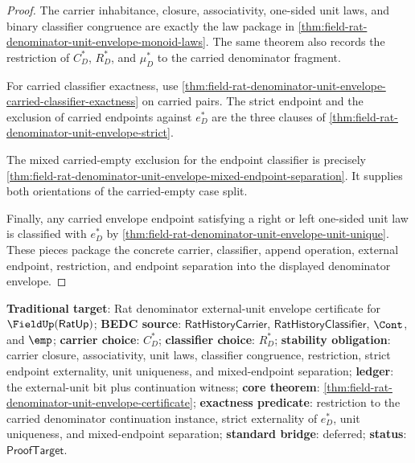 \begin{proof}
The carrier inhabitance, closure, associativity, one-sided unit laws, and binary
classifier congruence are exactly the law package in
\autoref{thm:field-rat-denominator-unit-envelope-monoid-laws}. The same theorem
also records the restriction of $C_D^\ast$, $R_D^\ast$, and $\mu_D^\ast$ to the
carried denominator fragment.

For carried classifier exactness, use
\autoref{thm:field-rat-denominator-unit-envelope-carried-classifier-exactness}
on carried pairs. The strict endpoint and the exclusion of carried endpoints
against $e_D^\ast$ are the three clauses of
\autoref{thm:field-rat-denominator-unit-envelope-strict}.

The mixed carried-empty exclusion for the endpoint classifier is precisely
\autoref{thm:field-rat-denominator-unit-envelope-mixed-endpoint-separation}.
It supplies both orientations of the carried-empty case split.

Finally, any carried envelope endpoint satisfying a right or left one-sided
unit law is classified with $e_D^\ast$ by
\autoref{thm:field-rat-denominator-unit-envelope-unit-unique}. These pieces
package the concrete carrier, classifier, append operation, external endpoint,
restriction, and endpoint separation into the displayed denominator envelope.
\end{proof}

\textbf{Traditional target}: Rat denominator external-unit envelope certificate
for $\FieldUp(\mathsf{RatUp})$;
\textbf{BEDC source}: $\mathsf{RatHistoryCarrier}$,
$\mathsf{RatHistoryClassifier}$, $\Cont$, and $\emp$; \textbf{carrier choice}:
$C_D^\ast$; \textbf{classifier choice}: $R_D^\ast$; \textbf{stability
obligation}: carrier closure, associativity, unit laws, classifier congruence,
restriction, strict endpoint externality, unit uniqueness, and mixed-endpoint
separation; \textbf{ledger}: the external-unit bit plus continuation witness;
\textbf{core theorem}:
\autoref{thm:field-rat-denominator-unit-envelope-certificate};
\textbf{exactness predicate}: restriction to the carried denominator
continuation instance, strict externality of $e_D^\ast$, unit uniqueness, and
mixed-endpoint separation;
\textbf{standard bridge}: deferred; \textbf{status}: $\mathsf{ProofTarget}$.

